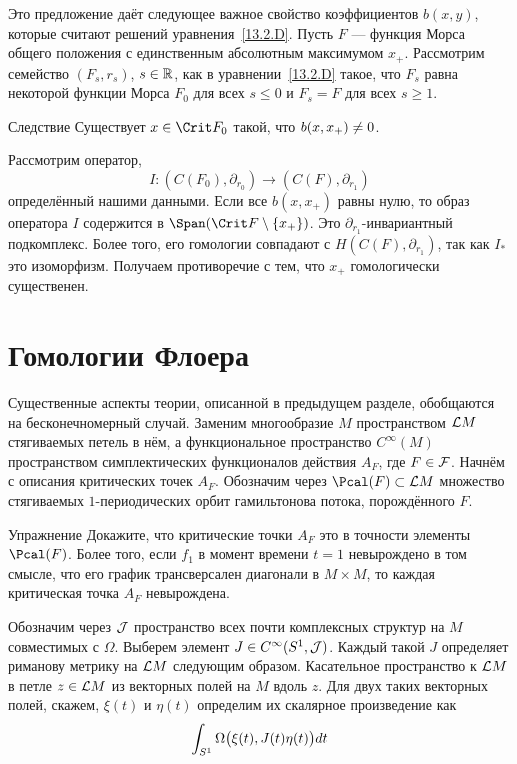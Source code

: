 Это предложение даёт следующее важное свойство коэффициентов $b(x,
y)$, которые считают  решений
уравнения~\ref{13.2.D}. 
Пусть $F$ --- функция Морса общего положения с единственным абсолютным
максимумом $x_{+}$.
Рассмотрим семейство $(F_{s},r_{s})$, $s\in\mathbb{R}$, как в
уравнении~\ref{13.2.D} такое, что $F_{s}$ равна некоторой функции
Морса $F_{0}$ для всех $s\le0$ и $F_{s} = F$ для всех $s\ge1$.


\begin{thm}{Следствие}\label{13.2.H}
  Существует $x\in\Crit F_{0}$ такой, что $b(x, x_{+})\z\neq0$.  
\end{thm}

Рассмотрим оператор,
\[
I:(C(F_{0}),\partial_{r_{0}})\to (C(F),\partial_{r_{1}})
\]
определённый нашими данными.
Если все $b(x,x_{+})$ равны нулю, то образ оператора $I$ содержится в
$\Span(\Crit F\setminus\{x_{+}\})$. 
Это $\partial_{r_{1}}$-ин\-ва\-ри\-ант\-ный подкомплекс.
Более того, его гомологии совпадают с $H(C(F),\partial_{r_{1}})$,
так как $I_{*}$ это изоморфизм.
Получаем противоречие с тем, что $x_{+}$ гомологически существенен.
\qeds

\section{Гомологии Флоера}\label{13.3}
Существенные аспекты теории, описанной в предыдущем разделе,
обобщаются на бесконечномерный случай.
Заменим многообразие $M$ пространством $\mathcal{L} M$ стягиваемых петель в нём, а функциональное
пространство $C^{\infty}(M)$ пространством симплектических
функционалов действия $A_{F}$, где $F\in\mathcal{F}$.
Начнём с описания критических точек $A_{F}$.
Обозначим через $\Pcal(F)\subset\L M$ множество стягиваемых
$1$-периодических орбит гамильтонова потока, порождённого $F$.

\begin{ex}{Упражнение}\label{13.3.A}
  Докажите, что критические точки $A_{F}$ это в точности элементы
  $\Pcal(F)$.
  Более того, если  $f_{1}$ в момент времени
    $t=1$ невырождено в том смысле, что его график
  трансверсален диагонали в $M\times M$, то каждая критическая точка
  $A_{F}$ невырождена.
\end{ex}
Обозначим через $\mathcal{J}$ пространство всех почти комплексных структур
на $M$ совместимых с $\Omega$.
Выберем элемент $J\in C^{\infty}(S^{1},\mathcal{J})$.
Каждый такой $J$ определяет риманову метрику на $\mathcal{L} M$ следующим образом.
Касательное пространство к $\mathcal{L} M$ в петле $z\in\mathcal{L} M$
 из векторных полей на $M$ вдоль $z$.
Для двух таких векторных полей, скажем, $\xi(t)$ и $\eta(t)$ определим
их скалярное произведение как 
\[
\int_{S^{1}}\Omega\big(\xi(t),J(t)\eta(t)\big)d t
\]

